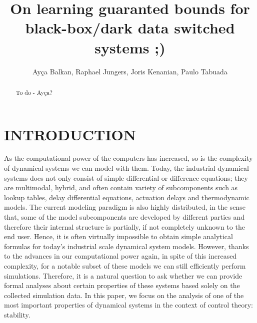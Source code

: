 \documentclass[letterpaper, 10 pt, conference]{ieeeconf}  %
\title{\LARGE \bf
On learning guaranted bounds for black-box/dark data switched systems ;)
}
\author{Ay\c{c}a Balkan, Raphael Jungers, Joris Kenanian, Paulo Tabuada%
}
\begin{document}
\maketitle
\thispagestyle{empty}
\pagestyle{empty}


\begin{abstract}

To do - Ay\c{c}a?

\end{abstract}


\section{INTRODUCTION}

As the computational power of the computers has increased, so is the complexity of dynamical systems we can model with them. Today, the industrial dynamical systems does not only consist of simple differential or difference equations; they are multimodal, hybrid, and often contain variety of subcomponents such as lookup tables, delay differential equations, actuation delays and thermodynamic models. The current modeling paradigm is also highly distributed, in the sense that, some of the model subcomponents are developed by different parties and therefore their internal structure is partially, if not completely unknown to the end user.
Hence, it is often virtually impossible to obtain simple analytical formulas for today's industrial scale dynamical system models. However, thanks to the advances in our computational power again, in spite of this increased complexity, for a notable subset of these models we can still efficiently perform simulations. Therefore, it is a natural question to ask whether we can provide formal analyses about certain properties of these systems based solely on the collected simulation data. In this paper, we focus on the analysis of one of the most important properties of dynamical systems in the context of control theory: stability.
\end{document}
